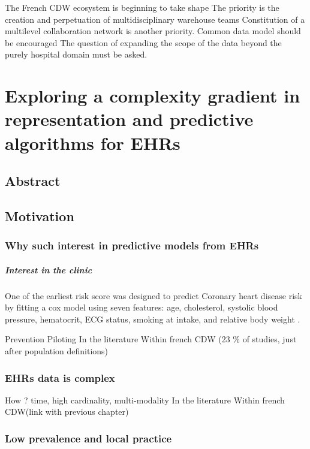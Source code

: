 \documentclass{report}
\begin{document}
The French CDW ecosystem is beginning to take shape
The priority is the creation and perpetuation of multidisciplinary warehouse teams
Constitution of a multilevel collaboration network is another priority.
Common data model should be encouraged
The question of expanding the scope of the data beyond the purely hospital domain must be asked.


\chapter{Exploring a complexity gradient in representation and predictive algorithms for EHRs}\label{chapter:predictive_models}
\section{Abstract}\label{sec:predictive_models:abstract}

\section{Motivation}\label{sec:predictive_models:motivation}

\subsection{Why such interest in predictive models from EHRs}\label{subsec:predictive_models:importance}

\paragraph{Interest in the clinic}

One of the earliest risk score was designed to predict Coronary heart disease
risk by fitting a cox model using seven features: age, cholesterol, systolic
blood pressure, hematocrit, ECG status, smoking at intake, and relative body
weight \citep{brand1976multivariate}.

Prevention
Piloting
In the literature
Within french CDW (23 \% of studies, just after population definitions)

\subsection{EHRs data is complex}\label{subsec:predictive_models:complex_data}
How ? time, high cardinality, multi-modality
In the literature
Within french CDW(link with previous chapter)

\subsection{Low prevalence and local practice}\label{subsec:predictive_models:low_prevalence}
\end{document}
